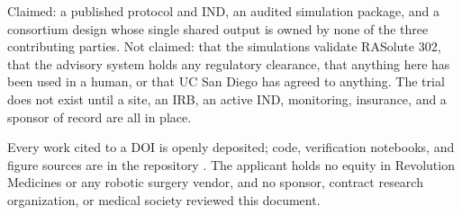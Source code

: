 \vspace{-0.2em}

Claimed: a published protocol and IND, an audited simulation package, and a
consortium design whose single shared output is owned by none of the three
contributing parties. Not claimed: that the simulations validate
RASolute 302, that the advisory system holds any regulatory clearance, that
anything here has been used in a human, or that UC San Diego has agreed to
anything. The trial does not exist until a site, an IRB, an active IND,
monitoring, insurance, and a sponsor of record are all in place.

\vspace{-0.2em}

Every work cited to a DOI is openly deposited; code, verification notebooks, and
figure sources are in the repository \cite{repo2026}. The applicant holds no
equity in Revolution Medicines or any robotic surgery vendor, and no sponsor,
contract research organization, or medical society reviewed this document.

\vspace{0.1em}
\apprule{0.4pt}
\vspace{-0.1em}

\vspace{-0.35em}
\begin{apprefs}


\end{apprefs}
